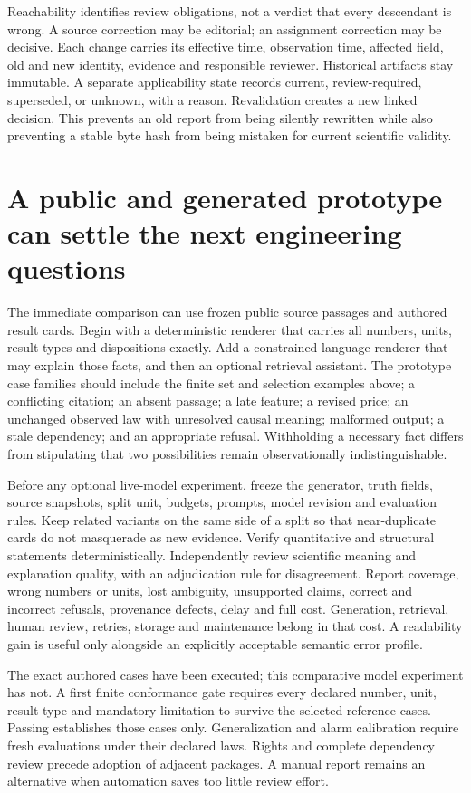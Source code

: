 Reachability identifies review obligations, not a verdict that every descendant
is wrong. A source correction may be editorial; an assignment correction may
be decisive. Each change carries its effective time, observation time, affected
field, old and new identity, evidence and responsible reviewer. Historical
artifacts stay immutable. A separate applicability state records current,
review-required, superseded, or unknown, with a reason. Revalidation creates a
new linked decision. This prevents an old report from being silently rewritten
while also preventing a stable byte hash from being mistaken for current
scientific validity.

\section{A public and generated prototype can settle the next engineering questions}

The immediate comparison can use frozen public source passages and authored
result cards. Begin with a deterministic renderer that carries all numbers,
units, result types and dispositions exactly. Add a constrained language
renderer that may explain those facts, and then an optional retrieval assistant.
The prototype case families should include the finite set and selection
examples above; a conflicting citation; an absent passage; a late feature;
a revised price; an unchanged observed law with unresolved causal meaning;
malformed output; a stale dependency; and an appropriate refusal. Withholding
a necessary fact differs from stipulating that two possibilities remain
observationally indistinguishable.
\citep{exec16_report_contract}

Before any optional live-model experiment, freeze the generator, truth fields,
source snapshots, split unit, budgets, prompts, model revision and evaluation
rules. Keep related variants on the same side of a split so that near-duplicate
cards do not masquerade as new evidence. Verify quantitative and structural
statements deterministically. Independently review scientific meaning and
explanation quality, with an adjudication rule for disagreement. Report coverage,
wrong numbers or units, lost ambiguity, unsupported claims, correct and incorrect
refusals, provenance defects, delay and full cost. Generation, retrieval, human
review, retries, storage and maintenance belong in that cost. A readability gain
is useful only alongside an explicitly acceptable semantic error profile.

The exact authored cases have been executed; this comparative model experiment
has not. A first finite conformance gate requires every declared number, unit,
result type and mandatory limitation to survive the selected reference cases.
Passing establishes those cases only. Generalization and alarm calibration
require fresh evaluations under their declared laws. Rights and complete
dependency review precede adoption of adjacent packages. A manual report
remains an alternative when automation saves too little review effort.

